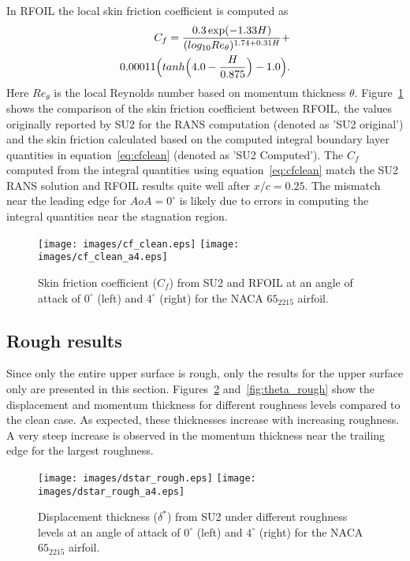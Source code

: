 In RFOIL the local skin friction coefficient is computed as~\cite{drela1986two}
\begin{eqnarray}
\noindent C_f = \frac{0.3\exp(-1.33H)}{(log_{10}Re_{\theta})^{1.74+0.31H}} \nonumber  + \\0.00011\Big(tanh \Big(4.0 - \frac{H}{0.875}\Big) - 1.0\Big).
    \label{eq:cfclean}
\end{eqnarray}
Here $Re_{\theta}$ is the local Reynolds number based on momentum thickness $\theta$. Figure~\ref{fig:cf_clean} shows the comparison of the skin friction coefficient between RFOIL, the values originally reported by SU2 for the RANS computation (denoted as 'SU2 original') and the skin friction calculated based on the computed integral boundary layer quantities in equation~\ref{eq:cfclean} (denoted as 'SU2 Computed'). The $C_f$ computed from the integral quantities using equation~\ref{eq:cfclean} match the SU2 RANS solution and RFOIL results quite well after $x/c=0.25$. The mismatch near the leading edge for $AoA=0^{\circ}$ is likely due to errors in computing the integral quantities near the stagnation region.
\begin{figure}[h!]
    \centering
    \captionsetup{justification=centering}
    \texttt{[image: images/cf\_clean.eps]}
    \texttt{[image: images/cf\_clean\_a4.eps]} 
    \caption{Skin friction coefficient ($C_f$) from SU2 and RFOIL at an angle of attack of $0^{\circ}$ (left) and $4^{\circ}$ (right) for the NACA $65_2215$ airfoil.}
    \label{fig:cf_clean}
\end{figure}

\subsection{Rough results}
\noindent Since only the entire upper surface is rough, only the results for the upper surface only are presented in this section. Figures~\ref{fig:dstar_rough} and~\ref{fig:theta_rough} show the displacement and momentum thickness for different roughness levels compared to the clean case. As expected, these thicknesses increase with increasing roughness. A very steep increase is observed in the momentum thickness near the trailing edge for the largest roughness. 
\begin{figure}[h!]
    \centering
    \captionsetup{justification=centering}
    \texttt{[image: images/dstar\_rough.eps]} 
    \texttt{[image: images/dstar\_rough\_a4.eps]}
    \caption{Displacement thickness ($\delta^*$) from SU2 under different roughness levels at an angle of attack of $0^{\circ}$ (left) and $4^{\circ}$ (right) for the NACA $65_2215$ airfoil.}
    \label{fig:dstar_rough}
\end{figure}


